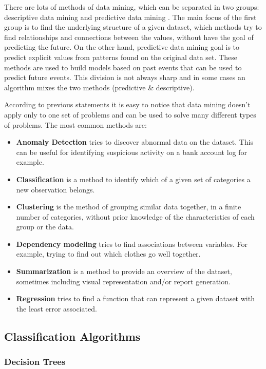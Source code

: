 There are lots of methods of data mining, which can be separated in two groups: descriptive data mining and predictive
data mining \cite{Fayyad96knowledgediscovery}.
The main focus of the first group is to find the underlying structure of a given dataset, which methods try to find relationships and connections
between the values, without have the goal of predicting the future. On the other hand,
predictive data mining goal is to predict explicit values from patterns found on the original data set. These methods are used to build models based on past
events that can be used to predict future events.
This division is not always sharp and in some cases an algorithm mixes the two methods (predictive \& descriptive)\cite{Fayyad96knowledgediscovery}.

According to previous statements it is easy to notice that data mining doesn't apply only to one set of problems and can be used to solve many different types of
problems. The most common methods are:
\begin{itemize}
\item \textbf{Anomaly Detection} tries to discover abnormal data on the dataset. This can be useful for identifying suspicious activity on a bank
account log for example.
\item \textbf{Classification} is a method to identify which of a given set of categories a new observation belongs.
\item \textbf{Clustering} is the method of grouping similar data together, in a finite number of categories, without prior knowledge of
the characteristics of each group or the data.
\item \textbf{Dependency modeling} tries to find associations between variables. For example, trying to find out which clothes go well together.
\item \textbf{Summarization} is a method to provide an overview of the dataset, sometimes including visual representation and/or report generation.
\item \textbf{Regression} tries to find a function that can represent a given dataset with the least error associated.
\end{itemize}

\subsection{Classification Algorithms}\label{sec:classification}

\subsubsection{Decision Trees}

